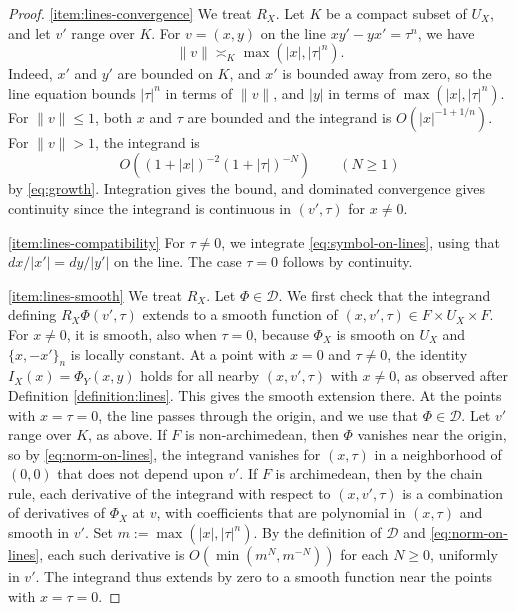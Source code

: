 \documentclass[reqno]{amsart}
\theoremstyle{plain}
\theoremstyle{definition}
\theoremstyle{itplain}
\numberwithin{equation}{section}
\numberwithin{theorem}{section}
\begin{document}
\begin{proof}
  \eqref{item:lines-convergence} We treat $R_X$.  Let $K$ be a compact subset of $U_X$, and let $v'$ range over $K$.  For $v = (x, y)$ on the line $x y' - y x' = \tau^n$, we have
  \begin{equation}\label{eq:norm-on-lines}
    \lVert v \rVert \asymp_K \max(\lvert x \rvert, \lvert \tau \rvert^n).
  \end{equation}
  Indeed, $x'$ and $y'$ are bounded on $K$, and $x'$ is bounded away from zero, so the line equation bounds $\lvert \tau \rvert^n$ in terms of $\lVert v \rVert$, and $\lvert y \rvert$ in terms of $\max(\lvert x \rvert, \lvert \tau \rvert^n)$.  For $\lVert v \rVert \leq 1$, both $x$ and $\tau$ are bounded and the integrand is $O(\lvert x \rvert^{-1+1/n})$.  For $\lVert v \rVert > 1$, the integrand is
  \begin{equation*}
    O((1+\lvert x \rvert)^{-2}(1+\lvert \tau \rvert)^{-N}) \qquad(N \geq 1)
  \end{equation*}
  by \eqref{eq:growth}.  Integration gives the bound, and dominated convergence gives continuity since the integrand is continuous in $(v',\tau)$ for $x \neq 0$.

  \eqref{item:lines-compatibility} For $\tau \neq 0$, we integrate \eqref{eq:symbol-on-lines}, using that $d x / \lvert x' \rvert = d y / \lvert y' \rvert$ on the line.  The case $\tau = 0$ follows by continuity.

  \eqref{item:lines-smooth} We treat $R_X$.  Let $\Phi \in \mathcal{D}$.  We first check that the integrand defining $R_X \Phi(v', \tau)$ extends to a smooth function of $(x, v', \tau) \in F \times U_X \times F$.  For $x \neq 0$, it is smooth, also when $\tau = 0$, because $\Phi_X$ is smooth on $U_X$ and $\{x, -x'\}_n$ is locally constant.  At a point with $x = 0$ and $\tau \neq 0$, the identity $I_X(x) = \Phi_Y(x, y)$ holds for all nearby $(x, v', \tau)$ with $x \neq 0$, as observed after Definition \ref{definition:lines}.  This gives the smooth extension there.  At the points with $x = \tau = 0$, the line passes through the origin, and we use that $\Phi \in \mathcal{D}$.  Let $v'$ range over $K$, as above.  If $F$ is non-archimedean, then $\Phi$ vanishes near the origin, so by \eqref{eq:norm-on-lines}, the integrand vanishes for $(x, \tau)$ in a neighborhood of $(0, 0)$ that does not depend upon $v'$.  If $F$ is archimedean, then by the chain rule, each derivative of the integrand with respect to $(x, v', \tau)$ is a combination of derivatives of $\Phi_X$ at $v$, with coefficients that are polynomial in $(x, \tau)$ and smooth in $v'$.  Set $m := \max(\lvert x \rvert, \lvert \tau \rvert^n)$.  By the definition of $\mathcal{D}$ and \eqref{eq:norm-on-lines}, each such derivative is $O(\min(m^N, m^{-N}))$ for each $N \geq 0$, uniformly in $v'$.  The integrand thus extends by zero to a smooth function near the points with $x = \tau = 0$.


\end{proof}
\end{document}
